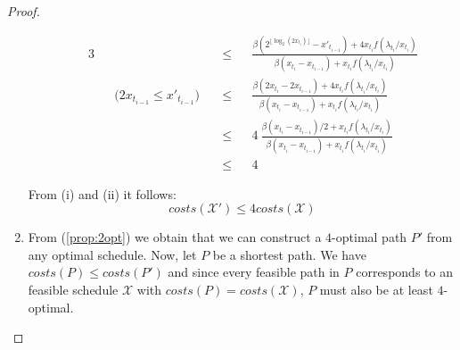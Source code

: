 \documentclass[hidelinks]{article}
\theoremstyle{plain}
\theoremstyle{definition}
\theoremstyle{rem}
\newcommand{\mx}{\mathcal{X}}
\begin{document}
\begin{sloppypar}
\begin{proof}
\begin{enumerate}
\begin{enumerate}[(i)]
\begin{alignat*}{3}
			&&&\le&&\frac{\beta(2^{\lfloor \log_2(2x_{t_i})\rfloor}-x'_{t_{i-1}})+4x_{t_i}f(\lambda_{t_i}/x_{t_i})}{\beta(x_{t_i}-x_{t_{i-1}})+x_{t_i}f(\lambda_{t_i}/x_{t_i})}\\
			&&\text{($2x_{t_{i-1}}\le x'_{t_{i-1}}$)}\quad&\le&&\frac{\beta(2x_{t_i}-2x_{t_{i-1}})+4x_{t_i}f(\lambda_{t_i}/x_{t_i})}{\beta(x_{t_i}-x_{t_{i-1}})+x_{t_i}f(\lambda_{t_i}/x_{t_i})}\\
			&&&\le&&4\ \frac{\beta(x_{t_i}-x_{t_{i-1}})/2+x_{t_i}f(\lambda_{t_i}/x_{t_i})}{\beta(x_{t_i}-x_{t_{i-1}})+x_{t_i}f(\lambda_{t_i}/x_{t_i})}\\
			&&&\le&&4
		\end{alignat*}
	\end{enumerate}
	From (i) and (ii) it follows:
	\begin{equation*}
		costs(\mx')\le4costs(\mx)
	\end{equation*}
	\item From (\ref{prop:2opt}) we obtain that we can construct a $4$-optimal path $P'$ from any optimal schedule. Now, let $P$ be a shortest path. We have $costs(P)\le costs(P')$ and since every feasible path in $P$ corresponds to an feasible schedule $\mx$ with $costs(P)=costs(\mx)$, $P$ must also be at least $4$-optimal.
\end{enumerate}
\end{proof}

\end{sloppypar}
\end{document}
